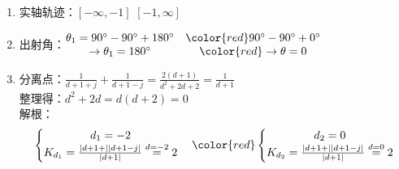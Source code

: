 \documentclass[handout,cjkutf8,table,aspectratio=1610]{beamer} %
\begin{document}
\begin{frame}{}
	\begin{enumerate}[(1)]
		\item 实轴轨迹：$[-\infty,-1]$\hspace{6em} {\color{red}$[-1,\infty]$}
		\item 出射角：$\begin{matrix}
						\theta_1=90^\circ - 90^\circ + 180^\circ & {\color{red}90^\circ - 90^\circ + 0^\circ}\\ 
						\rightarrow \theta_1=180^\circ & {\color{red}\rightarrow \theta=0}
					\end{matrix}$
		\item 分离点：$\frac{1}{d+1+j}+\frac{1}{d+1-j} = \frac{2(d+1)}{d^2+2d+2} = \frac{1}{d+1}$\\
			整理得：$d^2 + 2d = d(d+2) = 0$\\
			解根：$$\left\{\begin{matrix}
					d_1 = -2\\
					K_{d_1} = \frac{|d+1+||d+1-j|}{|d+1|} \overset{d=-2}{=} 2
				\end{matrix}\right.\quad
				{\color{red}\left\{\begin{matrix}
					d_2 = 0\\
					K_{d_2} = \frac{|d+1+||d+1-j|}{|d+1|} \overset{d=0}{=} 2
				\end{matrix}\right.}$$
	\end{enumerate}
\end{frame}
\end{document}
